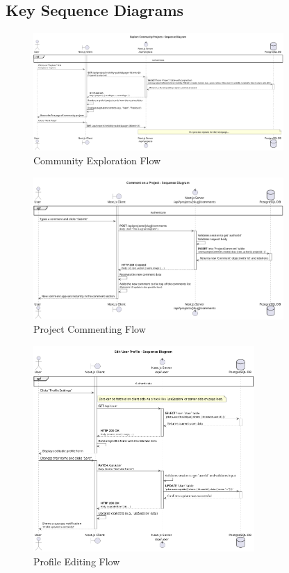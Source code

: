 \subsection{Key Sequence Diagrams}

\begin{figure}[H]
\centering
\includegraphics[width=0.85\textwidth]{conception/SprintV/sequence_diagrams/sequence_communityInteraction_6_1_ExploreCommunityAsUser.png}
\caption{Community Exploration Flow}
\label{fig:seq_explore_community}
\end{figure}

\begin{figure}[H]
\centering
\includegraphics[width=0.85\textwidth]{conception/SprintV/sequence_diagrams/sequence_communityInteraction_6_3_CommentOnProjects.png}
\caption{Project Commenting Flow}
\label{fig:seq_comment_projects}
\end{figure}

\begin{figure}[H]
\centering
\includegraphics[width=0.75\textwidth]{conception/SprintV/sequence_diagrams/sequence_profileManagement_7_1_EditUserProfile.png}
\caption{Profile Editing Flow}
\label{fig:seq_edit_profile}
\end{figure}

